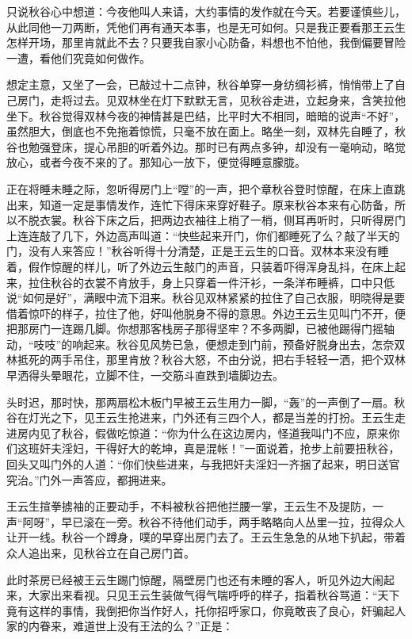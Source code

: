 \documentclass[12pt,UTF8]{ctexbook}
\begin{document}
{{{只说秋谷心中想道：今夜他叫人来请，大约事情的发作就在今天。若要谨慎些儿，从此同他一刀两断，凭他们再有通天本事，也是无可如何。只是我正要看那王云生怎样开场，那里肯就此不去？只要我自家小心防备，料想也不怕他，我倒偏要冒险一遭，看他们究竟如何做作。

想定主意，又坐了一会，已敲过十二点钟，秋谷单穿一身纺绸衫裤，悄悄带上了自己房门，走将过去。见双林坐在灯下默默无言，见秋谷走进，立起身来，含笑拉他坐下。秋谷觉得双林今夜的神情甚是巴结，比平时大不相同，暗暗的说声“不好”，虽然胆大，倒底也不免拖着惊慌，只毫不放在面上。略坐一刻，双林先自睡了，秋谷也勉强登床，提心吊胆的听着外边。那时已有两点多钟，却没有一毫响动，略觉放心，或者今夜不来的了。那知心一放下，便觉得睡意朦胧。

正在将睡未睡之际，忽听得房门上“嘡”的一声，把个章秋谷登时惊醒，在床上直跳出来，知道一定是事情发作，连忙下得床来穿好鞋子。原来秋谷本来有心防备，所以不脱衣裳。秋谷下床之后，把两边衣袖往上梢了一梢，侧耳再听时，只听得房门上连连敲了几下，外边高声叫道：“快些起来开门，你们都睡死了么？敲了半天的门，没有人来答应！”秋谷听得十分清楚，正是王云生的口音。双林本来没有睡着，假作惊醒的样儿，听了外边云生敲门的声音，只装着吓得浑身乱抖，在床上起来，拉住秋谷的衣裳不肯放手，身上只穿着一件汗衫，一条洋布睡裤，口中只低说“如何是好”，满眼中流下泪来。秋谷见双林紧紧的拉住了自己衣服，明晓得是要借着惊吓的样子，拉住了他，好叫他脱身不得的意思。外边王云生见叫门不开，便把那房门一连踢几脚。你想那客栈房子那得坚牢？不多两脚，已被他踢得门摇轴动，“吱吱”的响起来。秋谷见风势已急，便想走到门前，预备好脱身出去，怎奈双林抵死的两手吊住，那里肯放？秋谷大怒，不由分说，把右手轻轻一洒，把个双林早洒得头晕眼花，立脚不住，一交筋斗直跌到墙脚边去。

头时迟，那时快，那两扇松木板门早被王云生用力一脚，“轰”的一声倒了一扇。秋谷在灯光之下，见王云生抢进来，门外还有三四个人，都是当差的打扮。王云生走进房内见了秋谷，假做吃惊道：“你为什么在这边房内，怪道我叫门不应，原来你们这班奸夫淫妇，干得好大的乾坤，真是混帐！”一面说着，抢步上前要扭秋谷，回头又叫门外的人道：“你们快些进来，与我把奸夫淫妇一齐捆了起来，明日送官究治。”门外一声答应，都拥进来。

王云生揎拳掳袖的正要动手，不料被秋谷把他拦腰一掌，王云生不及提防，一声“阿呀”，早已滚在一旁。秋谷不待他们动手，两手略略向人丛里一拉，拉得众人让开一线。秋谷一个蹲身，噗的早穿出房门去了。王云生急急的从地下扒起，带着众人追出来，见秋谷立在自己房门首。

此时茶房已经被王云生踢门惊醒，隔壁房门也还有未睡的客人，听见外边大闹起来，大家出来看视。只见王云生装做气得气喘呼呼的样子，指着秋谷骂道：“天下竟有这样的事情，我倒把你当作好人，托你招呼家口，你竟敢丧了良心，奸骗起人家的内眷来，难道世上没有王法的么？”正是：

}}}
\end{document}
